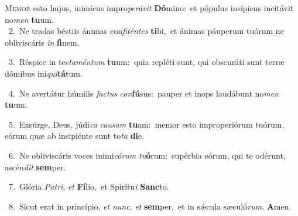 \lettrine{\initial\textcolor{\initialcolor}{M}}{emor} esto hujus, inimícus impro\-\textit{pe}\-\textit{rá}\textit{vit} \textbf{Dó}\-mino:~\star et pópulus insípiens incitávit no\textit{men} \textbf{tu}\-um.\\
{\numbfont\textcolor{\numbcolor}{~2.}}~Ne tradas béstiis ánimas con\-\textit{fi}\-\textit{tén}\textit{tes} \textbf{ti}\-bi,~\star et ánimas páuperum tuórum ne obliviscáris \textit{in} \textbf{fi}\-nem.\par
{\numbfont\textcolor{\numbcolor}{~3.}}~Réspice in tes\-\textit{ta}\-\textit{mén}\textit{tum} \textbf{tu}\-um:~\star quia repléti sunt, qui obscuráti sunt terræ dómibus ini\-\textit{qui}\-\textbf{tá}tum.\par
{\numbfont\textcolor{\numbcolor}{~4.}}~Ne avertátur húmilis \textit{fac}\-\textit{tus} \textit{con}\-\textbf{fú}sus:~\star pauper et inops laudábunt no\textit{men} \textbf{tu}\-um.\par
{\numbfont\textcolor{\numbcolor}{~5.}}~Exsúrge, Deus, júdi\textit{ca} \textit{cau}\-\textit{sam} \textbf{tu}\-am:~\star memor esto improperiórum tuórum, eórum quæ ab insipiénte sunt to\textit{ta} \textbf{di}\-e.\par
{\numbfont\textcolor{\numbcolor}{~6.}}~Ne obliviscáris voces inimi\-\textit{có}\-\textit{rum} \textit{tu}\-\textbf{ó}rum:~\star supérbia eórum, qui te odérunt, ascén\textit{dit} \textbf{sem}\-per.\par
{\numbfont\textcolor{\numbcolor}{~7.}}~Glória \textit{Pa}\-\textit{tri}, \textit{et} \textbf{Fí}\-lio,~\star et Spirítu\textit{i} \textbf{Sanc}\-to.\par
{\numbfont\textcolor{\numbcolor}{~8.}}~Sicut erat in princípio, \textit{et} \textit{nunc}\-, \textit{et} \textbf{sem}\-per,~\star et in sǽcula sæculó\-\textit{rum}\-. \textbf{A}\-men.\par
